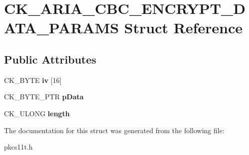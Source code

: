 \hypertarget{struct_c_k___a_r_i_a___c_b_c___e_n_c_r_y_p_t___d_a_t_a___p_a_r_a_m_s}{}\section{C\+K\+\_\+\+A\+R\+I\+A\+\_\+\+C\+B\+C\+\_\+\+E\+N\+C\+R\+Y\+P\+T\+\_\+\+D\+A\+T\+A\+\_\+\+P\+A\+R\+A\+MS Struct Reference}
\label{struct_c_k___a_r_i_a___c_b_c___e_n_c_r_y_p_t___d_a_t_a___p_a_r_a_m_s}
\subsection*{Public Attributes}
\begin{DoxyCompactItemize}
\item 
\mbox{\label{struct_c_k___a_r_i_a___c_b_c___e_n_c_r_y_p_t___d_a_t_a___p_a_r_a_m_s_acc009f272091e05095f5ccdeb09c9471}} 
C\+K\+\_\+\+B\+Y\+TE {\bfseries iv} \mbox{[}16\mbox{]}
\item 
\mbox{\label{struct_c_k___a_r_i_a___c_b_c___e_n_c_r_y_p_t___d_a_t_a___p_a_r_a_m_s_a453bfa7f583fe403750f16ec44c91299}} 
C\+K\+\_\+\+B\+Y\+T\+E\+\_\+\+P\+TR {\bfseries p\+Data}
\item 
\mbox{\label{struct_c_k___a_r_i_a___c_b_c___e_n_c_r_y_p_t___d_a_t_a___p_a_r_a_m_s_af1cb90e29189fac199d9d67400d1d03c}} 
C\+K\+\_\+\+U\+L\+O\+NG {\bfseries length}
\end{DoxyCompactItemize}


The documentation for this struct was generated from the following file\+:\begin{DoxyCompactItemize}
\item 
pkcs11t.\+h\end{DoxyCompactItemize}
